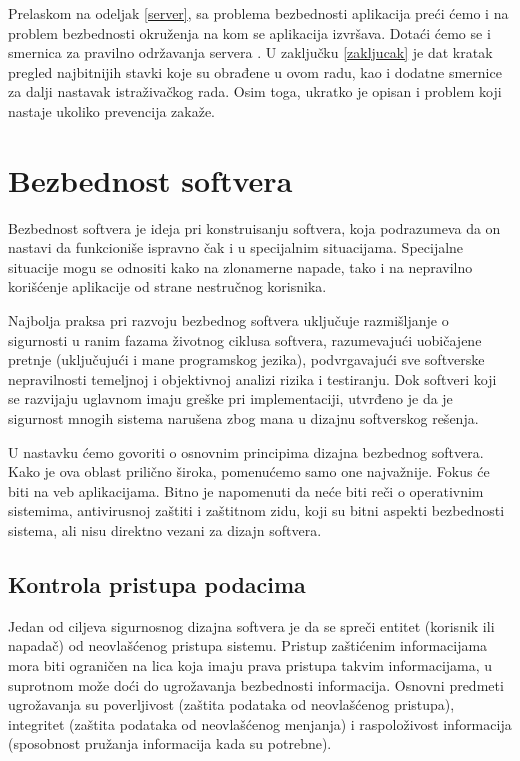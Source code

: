 \documentclass[a4paper]{article}
\begin{document}
Prelaskom na odeljak \ref{server}, sa problema bezbednosti aplikacija preći ćemo i na problem bezbednosti okruženja na kom se aplikacija izvršava. Dotaći ćemo se i smernica za pravilno održavanja servera \cite{WS}. U zaklju\v{c}ku \ref{zakljucak} je dat kratak pregled najbitnijih stavki koje su obrađene u ovom radu, kao i dodatne smernice za dalji nastavak istraživačkog rada. Osim toga, ukratko je opisan i problem koji nastaje ukoliko prevencija zakaže.

\section{Bezbednost softvera} \label{bezbednost}

Bezbednost softvera je ideja pri konstruisanju softvera, koja podrazumeva da on nastavi da funkcioniše ispravno čak i u specijalnim situacijama. Specijalne situacije mogu se odnositi kako na zlonamerne napade, tako i na nepravilno korišćenje aplikacije od strane nestručnog korisnika.

Najbolja praksa pri razvoju bezbednog softvera uključuje razmišljanje o sigurnosti u ranim fazama životnog ciklusa softvera, razumevajući uobičajene pretnje (uključujući i mane programskog jezika), podvrgavajući sve softverske nepravilnosti temeljnoj i objektivnoj analizi rizika i testiranju. Dok softveri koji se razvijaju uglavnom imaju greške pri implementaciji, utvrđeno je da je sigurnost mnogih sistema narušena zbog mana u dizajnu softverskog rešenja.

U nastavku ćemo govoriti o osnovnim principima dizajna bezbednog softvera. Kako je ova oblast prilično široka, pomenućemo samo one najvažnije. Fokus će biti na veb aplikacijama. Bitno je napomenuti da neće biti reči o operativnim sistemima, antivirusnoj zaštiti i zaštitnom zidu, koji su bitni aspekti bezbednosti sistema, ali nisu direktno vezani za dizajn softvera.

\subsection{Kontrola pristupa podacima}

Jedan od ciljeva sigurnosnog dizajna softvera je da se spreči entitet (korisnik ili napadač) od neovlašćenog pristupa sistemu. Pristup zaštićenim informacijama mora biti ograničen na lica koja imaju prava pristupa takvim informacijama, u suprotnom može doći do ugrožavanja bezbednosti informacija. Osnovni predmeti ugrožavanja \cite{SEC} su poverljivost (zaštita podataka od neovlašćenog pristupa), integritet (zaštita podataka od neovlašćenog menjanja) i raspoloživost informacija (sposobnost pružanja informacija kada su potrebne).
\end{document}
